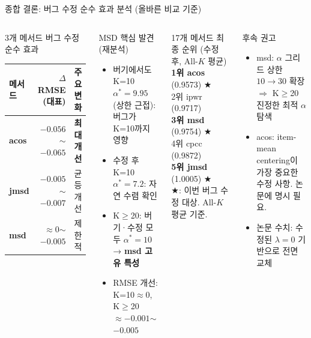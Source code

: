 \documentclass[aspectratio=169,10pt]{beamer}
\begin{document}
\begin{frame}[shrink=15]{종합 결론: 버그 수정 순수 효과 분석 (올바른 비교 기준)}
	\begin{columns}[T]
			\begin{alertblock}{3개 메서드 버그 수정 순수 효과}
				\small
				\renewcommand{\arraystretch}{1.15}
				\begin{tabular}{l|r|l}
					\toprule
					메서드 & $\Delta$RMSE (대표) & 주요 변화 \\
					\midrule
					\textbf{acos}  & $-0.056$$\sim$$-0.065$ & \textbf{최대 개선} \\
					\textbf{jmsd}  & $-0.005$$\sim$$-0.007$ & 균등 개선 \\
					\textbf{msd}   & $\approx 0$$\sim$$-0.005$ & 제한적 \\
					\bottomrule
				\end{tabular}
			\end{alertblock}
			\begin{block}{MSD 핵심 발견 (재분석)}
				\small
				\begin{itemize}
					\item 버기에서도 K=10 $\alpha^*=9.95$ (상한 근접): 버그가 K=10까지 영향
					\item 수정 후 K=10 $\alpha^*=7.2$: 자연 수렴 확인
					\item K$\geq$20: 버기·수정 모두 $\alpha^*=10$ → \textbf{msd 고유 특성}
					\item RMSE 개선: K=10$\approx 0$, K$\geq$20 $\approx -0.001$$\sim$$-0.005$
				\end{itemize}
			\end{block}

			\begin{exampleblock}{17개 메서드 최종 순위 (수정 후, All-$K$ 평균)}
				\small
				\textbf{1위 acos} (0.9573) \textcolor{testgreen}{★}\\
				2위 ipwr (0.9717)\\
				\textbf{3위 msd} (0.9754) \textcolor{testgreen}{★}\\
				4위 cpcc (0.9872)\\
				\textbf{5위 jmsd} (1.0005) \textcolor{testgreen}{★}\\
				{\tiny ★: 이번 버그 수정 대상. All-$K$ 평균 기준.}
			\end{exampleblock}
			\begin{block}{후속 권고}
				\small
				\begin{itemize}
					\item msd: $\alpha$ 그리드 상한 $10 \to 30$ 확장 $\Rightarrow$ K$\geq$20 진정한 최적 $\alpha$ 탐색
					\item acos: item-mean centering이 가장 중요한 수정 사항. 논문에 명시 필요.
					\item 논문 수치: 수정된 $\lambda=0$ 기반으로 전면 교체
				\end{itemize}
			\end{block}
	\end{columns}
\end{frame}
\end{document}

